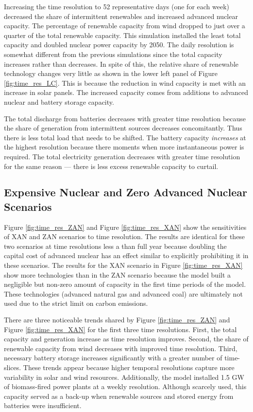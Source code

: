 Increasing the time resolution to 52 representative days (one for
each week) decreased the share of intermittent renewables and increased advanced
nuclear capacity. The percentage of renewable capacity from wind dropped to
just over a quarter of the total renewable capacity. This simulation installed
the least total capacity and doubled nuclear power capacity by 2050.
The daily resolution is somewhat different from the previous simulations
since the total capacity increases rather than decreases.
In spite of this, the relative share of renewable technology changes very little
as shown in the lower left panel of Figure \ref{fig:time_res_LC}.
This is because the reduction in wind capacity is met with an increase in solar
panels. The increased capacity comes from additions to advanced nuclear and battery
storage capacity.

The total discharge from batteries decreases with greater time resolution because
the share of generation from intermittent sources decreases concomitantly. Thus
there is less total load that needs to be shifted. The battery capacity \textit{increases}
at the highest resolution because there moments when more instantaneous power is
required. The total electricity generation decreases with greater time resolution
for the same reason --- there is less excess renewable capacity to curtail.

\subsection{Expensive Nuclear and Zero Advanced Nuclear Scenarios}
\label{section:zan_xan}

Figure \ref{fig:time_res_ZAN} and Figure \ref{fig:time_res_XAN} show the sensitivities of
\gls{XAN} and \gls{ZAN} scenarios to time resolution.
The results are identical for these two scenarios at time resolutions less a than
full year because doubling the capital cost of advanced nuclear has an effect similar
to explicitly prohibiting it in these scenarios. The results for the \gls{XAN}
scenario in Figure \ref{fig:time_res_XAN} show more technologies than in the
\gls{ZAN} scenario because the model built a negligible but non-zero amount of
capacity in the first time periods of the model. These technologies (advanced natural
gas and advanced coal) are ultimately not used due to the strict limit on carbon
emissions.

There are three noticeable trends shared by Figure \ref{fig:time_res_ZAN} and Figure
\ref{fig:time_res_XAN} for the first three time resolutions.
 First, the total capacity and generation increase as time resolution improves.
Second, the share of renewable capacity from wind decreases with improved time resolution.
Third, necessary battery storage increases significantly with a greater number of time-
slices. These trends appear because higher temporal resolutions capture more
variability in solar and wind resources. Additionally, the model installed 1.5 GW
of biomass-fired power plants at a weekly resolution. Although scarcely used,
this capacity served as a back-up when renewable sources and stored energy from
batteries were insufficient.

